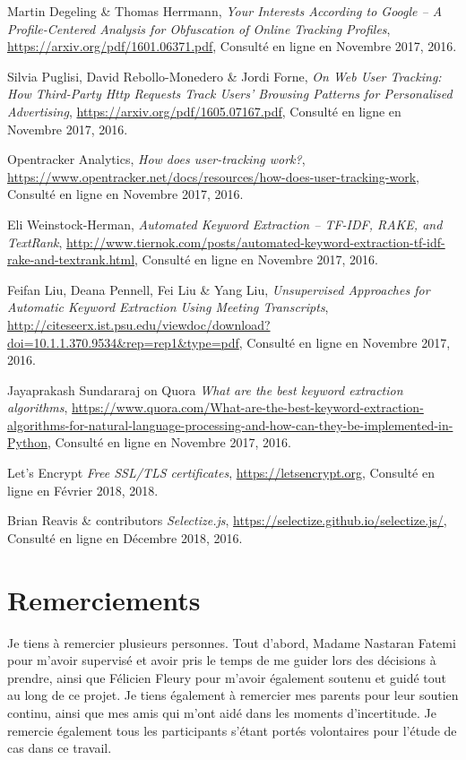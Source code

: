 \begin{thebibliography}{9}
  Martin Degeling \& Thomas Herrmann,
  \emph{Your Interests According to Google – A Profile-Centered Analysis
for Obfuscation of Online Tracking Profiles},
  \url{https://arxiv.org/pdf/1601.06371.pdf},
  Consulté en ligne en Novembre 2017,
  2016.

  Silvia Puglisi, David Rebollo-Monedero \& Jordi Forne,
  \emph{On Web User Tracking: How Third-Party Http
Requests Track Users’ Browsing Patterns for
Personalised Advertising},
  \url{https://arxiv.org/pdf/1605.07167.pdf},
  Consulté en ligne en Novembre 2017,
  2016.

  Opentracker Analytics,
  \emph{How does user-tracking work?},
  \url{https://www.opentracker.net/docs/resources/how-does-user-tracking-work},
  Consulté en ligne en Novembre 2017,
  2016.

  Eli Weinstock-Herman,
  \emph{Automated Keyword Extraction – TF-IDF, RAKE, and TextRank},
  \url{http://www.tiernok.com/posts/automated-keyword-extraction-tf-idf-rake-and-textrank.html},
  Consulté en ligne en Novembre 2017,
  2016.

  Feifan Liu, Deana Pennell, Fei Liu \& Yang Liu,
  \emph{Unsupervised Approaches for Automatic Keyword Extraction Using Meeting Transcripts},
  \url{http://citeseerx.ist.psu.edu/viewdoc/download?doi=10.1.1.370.9534&rep=rep1&type=pdf},
  Consulté en ligne en Novembre 2017,
  2016.

  Jayaprakash Sundararaj on Quora
  \emph{What are the best keyword extraction algorithms},
  \url{https://www.quora.com/What-are-the-best-keyword-extraction-algorithms-for-natural-language-processing-and-how-can-they-be-implemented-in-Python},
  Consulté en ligne en Novembre 2017,
  2016.

  Let's Encrypt
  \emph{Free SSL/TLS certificates},
  \url{https://letsencrypt.org},
  Consulté en ligne en Février 2018,
  2018.

  Brian Reavis \& contributors
  \emph{Selectize.js},
  \url{https://selectize.github.io/selectize.js/},
  Consulté en ligne en Décembre 2018,
  2016.



\end{thebibliography}

\printglossary

\chapter*{Remerciements}
Je tiens à remercier plusieurs personnes. Tout d'abord, Madame Nastaran Fatemi pour m'avoir supervisé et avoir pris le temps de me guider lors des décisions à prendre, ainsi que Félicien Fleury pour m'avoir également soutenu et guidé tout au long de ce projet. Je tiens également à remercier mes parents pour leur soutien continu, ainsi que mes amis qui m'ont aidé dans les moments d'incertitude. Je remercie également tous les participants s'étant portés volontaires pour l'étude de cas dans ce travail.

